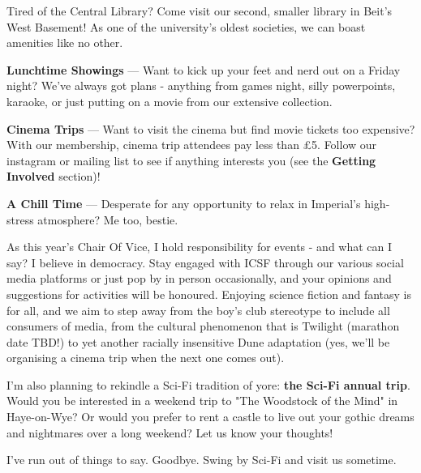 Tired of the Central Library? Come visit our second, smaller library in Beit's West Basement! As one of the university's oldest societies, we can boast amenities like no other.

\textbf{Lunchtime Showings} --- Want to kick up your feet and nerd out on a Friday night? We've always got plans - anything from games night, silly powerpoints, karaoke, or just putting on a movie from our extensive collection.

\textbf{Cinema Trips} --- Want to visit the cinema but find movie tickets too expensive? With our membership, cinema trip attendees pay less than £5. Follow our instagram or mailing list to see if anything interests you (see the \textbf{Getting Involved} section)!

\textbf{A Chill Time} --- Desperate for any opportunity to relax in Imperial's high-stress atmosphere? Me too, bestie.

As this year's Chair Of Vice, I hold responsibility for events - and what can I say? I believe in democracy. Stay engaged with ICSF through our various social media platforms or just pop by in person occasionally, and your opinions and suggestions for activities will be honoured. Enjoying science fiction and fantasy is for all, and we aim to step away from the boy's club stereotype to include all consumers of media, from the cultural phenomenon that is Twilight (marathon date TBD!) to yet another racially insensitive Dune adaptation (yes, we'll be organising a cinema trip when the next one comes out).

I'm also planning to rekindle a Sci-Fi tradition of yore: \textbf{the Sci-Fi annual trip}. Would you be interested in a weekend trip to "The Woodstock of the Mind" in Haye-on-Wye? Or would you prefer to rent a castle to live out your gothic dreams and nightmares over a long weekend? Let us know your thoughts!

I've run out of things to say. Goodbye. Swing by Sci-Fi and visit us sometime.